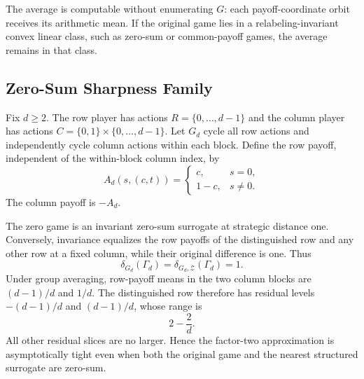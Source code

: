 The average is computable without enumerating $G$: each payoff-coordinate orbit receives its arithmetic mean.  If the original game lies in a relabeling-invariant convex linear class, such as zero-sum or common-payoff games, the average remains in that class.

\subsection{Zero-Sum Sharpness Family}

Fix $d\ge2$.  The row player has actions $R=\{0,\ldots,d-1\}$ and the column player has actions
$C=\{0,1\}\times\{0,\ldots,d-1\}$.  Let $G_d$ cycle all row actions and independently cycle column actions within each block.  Define the row payoff, independent of the within-block column index, by
\[
A_d(s,(c,t))
=
\begin{cases}
c,&s=0,\\
1-c,&s\ne0.
\end{cases}
\]
The column payoff is $-A_d$.

The zero game is an invariant zero-sum surrogate at strategic distance one.  Conversely, invariance equalizes the row payoffs of the distinguished row and any other row at a fixed column, while their original difference is one.  Thus
\[
\delta_{G_d}(\Gamma_d)
=
\delta_{G_d,\mathcal Z}(\Gamma_d)
=1.
\]
Under group averaging, row-payoff means in the two column blocks are $(d-1)/d$ and $1/d$.  The distinguished row therefore has residual levels $-(d-1)/d$ and $(d-1)/d$, whose range is
\[
2-\frac{2}{d}.
\]
All other residual slices are no larger.  Hence the factor-two approximation is asymptotically tight even when both the original game and the nearest structured surrogate are zero-sum.
